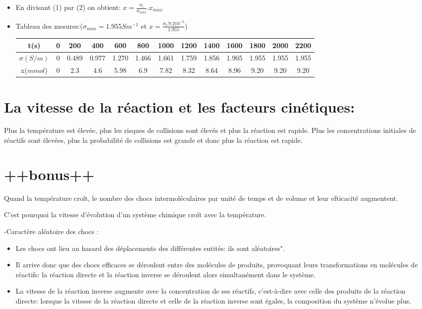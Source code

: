 \documentclass[12pt]{article}
\begin{document}
\begin{itemize}
	\item En divisant (1) par (2) on obtient: $x = \frac{\sigma_t}{\sigma_{max}}. x_{max}$

	\item Tableau des mesures:($\sigma_{max}=1.955Sm^{-1}$ et $x=\frac{\sigma_t.9.210^{-3}}{1.955}$)

	      \begin{center}
		      \begin{tabular}{|c|c|c|c|c|c|c|c|c|c|c|c|c|}
			      \hline
			      t(s)          & 0 & 200   & 400   & 600   & 800   & 1000  & 1200  & 1400  & 1600  & 1800  & 2000  & 2200  \\\hline
			      $\sigma(S/m)$ & 0 & 0.489 & 0.977 & 1.270 & 1.466 & 1.661 & 1.759 & 1.856 & 1.905 & 1.955 & 1.955 & 1.955 \\\hline
			      x($mmol$)     & 0 & 2.3   & 4.6   & 5.98  & 6.9   & 7.82  & 8.32  & 8.64  & 8.96  & 9.20  & 9.20  & 9.20  \\\hline
		      \end{tabular}
	      \end{center}
\end{itemize}

\section*{La vitesse de la réaction et les facteurs cinétiques: }
Plus la température est élevée, plus les risques de collisions sont élevés et plus la réaction est rapide.
Plus les concentrations initiales de réactifs sont élevées, plus la probabilité de collisions est grande et donc plus la réaction est
rapide.
\section*{++bonus++}
Quand la température croît, le nombre des chocs intermoléculaires par unité de temps et de volume et leur efticacité augmentent.

C'est pourquoi la vitesse d'évolution d'un système chimique croît avec la température.

-Caractère aléatoire des chocs :
\begin{itemize}
	\item Les chocs ont lieu au hasard des déplacements des différentes entités: ils
	      sont aléatoires".

	\item Il arrive donc que des chocs efficaces se déroulent entre des molécules de
	      produits, provoquant leurs transformations en molécules de réactifs: la
	      réaction directe et la réaction inverse se déroulent alors simultanément dans
	      le système.

	\item La vitesse de la réaction inverse augmente avec la concentration de ses
	      réactifs, c'est-à-dire avec celle des produits de la réaction directe: lorsque la
	      vitesse de la réaction directe et celle de la réaction inverse sont égales, la
	      composition du système n'évolue plus.

\end{itemize}
\end{document}
